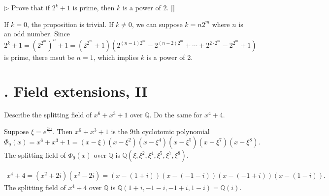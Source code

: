 \begin{problem}[3.15]
$\triangleright$ Prove that if $2^k+1$ is prime, then $k$ is a power of 2. []
\end{problem}
\begin{solution}
If $k=0$, the proposition is trivial. If $k\ne0$, we can suppose $k=n2^m$ where $n$ is an odd number. Since
\[
	2^k+1=\left(2^{2^m}\right)^n+1=\left(2^{2^m}+1\right)\left(2^{(n-1)2^m}-2^{(n-2)2^m}+\cdots+2^{2\cdot 2^m}-2^{ 2^m}+1\right)
\]
is prime, there msut be $n=1$, which implies $k$ is a power of 2.
\end{solution}
\section{. Field extensions, II}
\begin{problem}[4.2]
Describe the splitting field of $x^6+x^3+1$ over $\mathbb{Q}$. Do the same for $x^4+4$.
\end{problem}
\begin{solution}
Suppose $\xi=e^{\frac{2\pi i}{9}}$. Then $x^6+x^3+1$ is the 9th cyclotomic polynomial
\[
	\Phi_9(x)=x^6+x^3+1=\left(x-\xi\right)\left(x-\xi^2\right)\left(x-\xi^4\right)\left(x-\xi^5\right)\left(x-\xi^7\right)\left(x-\xi^8\right).
\]
The splitting field of $\Phi_9(x)$ over $\mathbb{Q}$ is $\mathbb{Q}(\xi,\xi^2,\xi^4,\xi^5,\xi^7,\xi^8)$. 

\begin{align*}
	x^4+4=(x^2+2i)(x^2-2i)=(x-(1+i))(x-(-1-i))(x-(-1+i))(x-(1-i)).
\end{align*}
The splitting field of $x^4+4$ over $\mathbb{Q}$ is $\mathbb{Q}(1+i,-1-i,-1+i,1-i)=\mathbb{Q}(i)$.
\end{solution}

